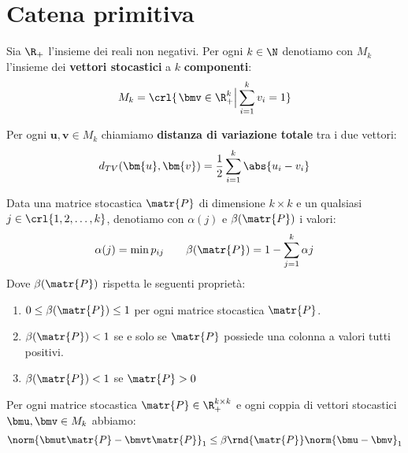 \documentclass[\main/main.tex]{subfiles}
\begin{document}
\section{Catena primitiva}
\begin{definition}
  Sia \(\R_+\) l'insieme dei reali non negativi. Per ogni \(k \in \N \) denotiamo con \(M_k\) l'insieme dei \textbf{vettori stocastici} a \(k\) \textbf{componenti}:
  \[
    M_k = \crl{\left. \bmv \in \R^k_+ \right\rvert \sum_{i=1}^k v_i = 1}
  \]
\end{definition}

\begin{definition}
  Per ogni \(\bm{u},\bm{v} \in M_k\) chiamiamo \textbf{distanza di variazione totale} tra i due vettori:
  \[
    d_{TV}(\bm{u},\bm{v}) = \frac{1}{2}\sum_{i=1}^k \abs{u_i - v_i}
  \]
\end{definition}

\begin{definition}
  Data una matrice stocastica \(\matr{P}\) di dimensione \(k \times k\) e un qualsiasi \(j \in \crl{1, 2, \ldots, k}\), denotiamo con \(\alpha(j)\) e \(\beta(\matr{P})\) i valori:
  \[
    \alpha(j) = \min{p_{ij}} \qquad \beta(\matr{P}) = 1 - \sum_{j=1}^k \alpha{j}
  \]
  Dove \(\beta(\matr{P})\) rispetta le seguenti proprietà:
  \begin{enumerate}
    \item \(0\leq \beta(\matr{P}) \leq 1\) per ogni matrice stocastica \(\matr{P}\).
    \item \(\beta(\matr{P}) < 1\) se e solo se \(\matr{P}\) possiede una colonna a valori tutti positivi.
    \item \(\beta(\matr{P}) < 1\) se \(\matr{P} > 0\)
  \end{enumerate}
\end{definition}

\clearpage

\begin{lemma}
  Per ogni matrice stocastica \(\matr{P} \in \R^{k\times k}_+\) e ogni coppia di vettori stocastici \(\bmu, \bmv \in M_k\) abbiamo:
  \[
    \norm{\bmut \matr{P} - \bmvt \matr{P}}_1 \leq \beta\rnd{\matr{P}} \norm{\bmu - \bmv}_1
  \]
\end{lemma}
\end{document}

